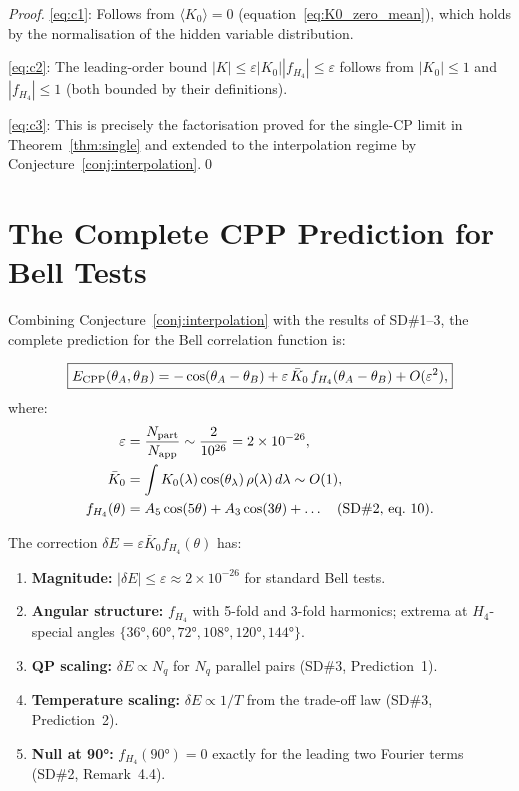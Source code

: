 \documentclass[11pt,a4paper]{article}
\newcommand{\eps}{\varepsilon}
\newcommand{\Napp}{N_{\rm app}}
\newcommand{\Npart}{N_{\rm part}}
\begin{document}
\begin{proof}
\eqref{eq:c1}: Follows from $\langle K_0\rangle = 0$
(equation~\eqref{eq:K0_zero_mean}), which holds by the normalisation
of the hidden variable distribution.

\eqref{eq:c2}: The leading-order bound $|K| \leq \eps |K_0|
|f_{H_4}| \leq \eps$ follows from $|K_0| \leq 1$ and $|f_{H_4}|
\leq 1$ (both bounded by their definitions).

\eqref{eq:c3}: This is precisely the factorisation proved for
the single-CP limit in Theorem~\ref{thm:single} and extended to
the interpolation regime by Conjecture~\ref{conj:interpolation}.\qed
\end{proof}

\section{The Complete CPP Prediction for Bell Tests}
\label{sec:prediction}

Combining Conjecture~\ref{conj:interpolation} with the results of
SD\#1--3, the complete prediction for the Bell correlation function is:

\begin{equation}
\boxed{
E_{\rm CPP}(\theta_A,\theta_B)
= -\cos(\theta_A-\theta_B)
+ \eps\,\bar K_0\,f_{H_4}(\theta_A-\theta_B)
+ O(\eps^2),
}
\label{eq:E_CPP_final}
\end{equation}
where:
\begin{align}
\eps &= \frac{\Npart}{\Napp} \sim \frac{2}{10^{26}} = 2\times10^{-26},
  \label{eq:eps_value} \\
\bar K_0 &= \int K_0(\lambda)\cos(\theta_\lambda)\,\rho(\lambda)\,d\lambda
  \sim O(1),
  \label{eq:K0bar} \\
f_{H_4}(\theta) &= A_5\cos(5\theta) + A_3\cos(3\theta) + \ldots
  \quad\text{(SD\#2, eq.~10)}.
  \label{eq:fH4_recall}
\end{align}

The correction $\delta E = \eps\bar K_0 f_{H_4}(\theta)$ has:
\begin{enumerate}
\item \textbf{Magnitude:} $|\delta E| \leq \eps \approx 2\times10^{-26}$
  for standard Bell tests.
\item \textbf{Angular structure:} $f_{H_4}$ with 5-fold and 3-fold
  harmonics; extrema at $H_4$-special angles $\{36°, 60°, 72°,
  108°, 120°, 144°\}$.
\item \textbf{QP scaling:} $\delta E \propto N_q$ for $N_q$ parallel
  pairs (SD\#3, Prediction~1).
\item \textbf{Temperature scaling:} $\delta E \propto 1/T$ from
  the trade-off law (SD\#3, Prediction~2).
\item \textbf{Null at 90°:} $f_{H_4}(90°) = 0$ exactly for the
  leading two Fourier terms (SD\#2, Remark~4.4).
\end{enumerate}
\end{document}
